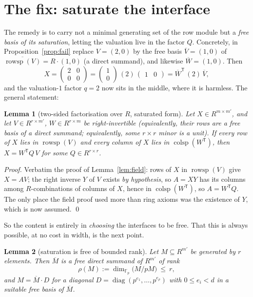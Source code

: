\documentclass[11pt,a4paper]{article}
\theoremstyle{plain}
\newtheorem{lemma}{Lemma}
\theoremstyle{definition}
\newcommand{\R}{R}
\newcommand{\rowsp}{\operatorname{rowsp}}
\newcommand{\colsp}{\operatorname{colsp}}
\newcommand{\sat}[1]{\overline{#1}}
\newcommand{\T}{^{\mathsf T}}
\newcommand{\Fp}{\mathbb{F}_p}
\begin{document}
\section{The fix: saturate the interface}

The remedy is to carry not a minimal generating set of the row module but
a \emph{free basis of its saturation}, letting the valuation live in the
factor $Q$. Concretely, in Proposition~\ref{prop:fail} replace $V=(2,0)$
by the free basis $\sat V=(1,0)$ of $\sat{\rowsp(V)}=\R\cdot(1,0)$ (a
direct summand), and likewise $\sat W=(1,0)$. Then
\[
  X=\begin{pmatrix}2&0\\0&0\end{pmatrix}
   =\begin{pmatrix}1\\0\end{pmatrix}\,(2)\,\begin{pmatrix}1&0\end{pmatrix}
   =\sat W\T\,(2)\,\sat V,
\]
and the valuation-$1$ factor $q=2$ now sits in the middle, where it is
harmless. The general statement:

\begin{lemma}[two-sided factorisation over $\R$, saturated form]
\label{lem:ring}
Let $X\in\R^{m\times m'}$, and let $V\in\R^{r\times m'}$, $W\in\R^{r\times
m}$ be \emph{right-invertible} (equivalently, their rows are a free basis
of a direct summand; equivalently, some $r\times r$ minor is a unit). If
every row of $X$ lies in $\rowsp(V)$ and every column of $X$ lies in
$\colsp(W\T)$, then $X=W\T Q\,V$ for some $Q\in\R^{r\times r}$.
\end{lemma}

\begin{proof}
Verbatim the proof of Lemma~\ref{lem:field}: rows of $X$ in $\rowsp(V)$
give $X=AV$; the right inverse $Y$ of $V$ exists \emph{by hypothesis}, so
$A=XY$ has its columns among $\R$-combinations of columns of $X$, hence in
$\colsp(W\T)$, so $A=W\T Q$. The only place the field proof used more than
ring axioms was the existence of $Y$, which is now assumed. \qed
\end{proof}

So the content is entirely in \emph{choosing} the interfaces to be free.
That this is always possible, at no cost in width, is the next point.

\begin{lemma}[saturation is free of bounded rank]\label{lem:sat}
Let $M\subseteq\R^{m'}$ be generated by $r$ elements. Then $\sat M$ is a
free direct summand of $\R^{m'}$ of rank
\[
  \rho(M):=\dim_{\Fp}\bigl(M/pM\bigr)\ \le\ r ,
\]
and $M=\sat M\cdot D$ for a diagonal $D=\operatorname{diag}(p^{e_1},\dots,
p^{e_{\rho}})$ with $0\le e_i<d$ in a suitable free basis of $\sat M$.
\end{lemma}
\end{document}
